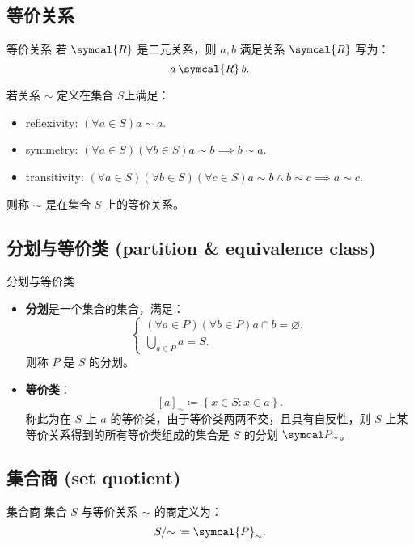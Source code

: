 \subsection{等价关系}


\begin{defi}{等价关系}
    若 \(\symcal{R} \) 是二元关系，则 \(a,b\) 满足关系 \(\symcal{R} \) 写为：
    \[
        a\mathop{\symcal{R}}b
        .\]

    若关系 \(\sim\) 定义在集合 \(S\)上满足：
    \begin{itemize}
        \item reflexivity: \((\forall a\in S) a \sim a\).
        \item symmetry: \((\forall a\in S)(\forall b\in S) a\sim b \implies b \sim a\).
        \item transitivity: \((\forall a\in S)(\forall b\in S)(\forall c\in S) a\sim b \land b\sim c \implies a\sim c\).
    \end{itemize}
    则称 \(\sim\) 是在集合 \(S\) 上的等价关系。
\end{defi}


\subsection{分划与等价类 (partition \& equivalence class)}

\begin{defi}{分划与等价类}
    \begin{itemize}
        \item \textbf{分划}是一个集合的集合，满足：
              \[
                  \begin{cases}
                      (\forall a\in P) (\forall b \in P) a \cap b = \varnothing, \\
                      \bigcup_{a \in P} a = S.
                  \end{cases}
              \]
              则称 \(P\) 是 \(S\) 的分划。
        \item \textbf{等价类}：
              \[
                  [a]_{\sim} \coloneqq  \left\{ x \in S : x \in a \right\}
                  .\]
              称此为在 \(S\) 上 \(a\) 的等价类，由于等价类两两不交，且具有自反性，则 \(S\) 上某等价关系得到的所有等价类组成的集合是 \(S\) 的分划 \(\symcal P_{\sim}\)。
    \end{itemize}
\end{defi}


\subsection{集合商 (set quotient)}
\begin{defi}{集合商}
    集合 \(S\) 与等价关系 \(\sim\) 的商定义为：
    \[
        S /\mathord \sim \coloneqq\symcal{P} _{\sim}
        .\]
\end{defi}

